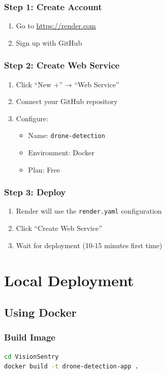 \documentclass[11pt,a4paper]{article}
\begin{document}
\subsubsection{Step 1: Create Account}
\begin{enumerate}
    \item Go to \url{https://render.com}
    \item Sign up with GitHub
\end{enumerate}

\subsubsection{Step 2: Create Web Service}
\begin{enumerate}
    \item Click ``New +'' → ``Web Service''
    \item Connect your GitHub repository
    \item Configure:
    \begin{itemize}
        \item Name: \texttt{drone-detection}
        \item Environment: Docker
        \item Plan: Free
    \end{itemize}
\end{enumerate}

\subsubsection{Step 3: Deploy}
\begin{enumerate}
    \item Render will use the \texttt{render.yaml} configuration
    \item Click ``Create Web Service''
    \item Wait for deployment (10-15 minutes first time)
\end{enumerate}

\section{Local Deployment}

\subsection{Using Docker}

\subsubsection{Build Image}
\begin{lstlisting}[language=bash]
cd VisionSentry
docker build -t drone-detection-app .
\end{lstlisting}
\end{document}
